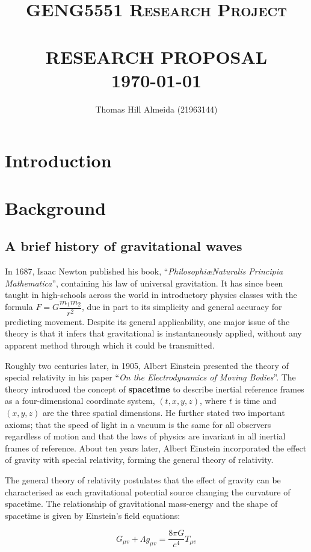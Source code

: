 \documentclass{article}
\title{\normalsize \textsc{GENG5551 Research Project}
        \\ [1.5cm]
        \HRule{0.5pt} \\
        \LARGE \textbf{\uppercase{Research Proposal}}
        \HRule{2pt} \\ [0.5cm]
        \normalsize \today \vspace*{3\baselineskip}}
\author{Thomas Hill Almeida (21963144)}
\date{}
\begin{document}
\maketitle{}
\tableofcontents{}
\newpage{}

\section*{Introduction}
\section{Background}

\subsection{A brief history of gravitational waves}

In 1687, Isaac Newton published his book, ``\textit{Philosophi\ae Naturalis Principia Mathematica}'', containing his law of universal gravitation. It has since been taught in high-schools across the world in introductory physics classes with the formula \( F = G\dfrac{m_1m_2}{r^2} \), due in part to its simplicity and general accuracy for predicting movement. Despite its general applicability, one major issue of the theory is that it infers that gravitational is instantaneously applied, without any apparent method through which it could be transmitted.

Roughly two centuries later, in 1905, Albert Einstein presented the theory of special relativity in his paper ``\textit{On the Electrodynamics of Moving Bodies}''. The theory introduced the concept of \textbf{spacetime} to describe inertial reference frames as a four-dimensional coordinate system, \((t, x, y, z)\), where $t$ is time and $(x, y, z)$ are the three spatial dimensions. He further stated two important axioms; that the speed of light in a vacuum is the same for all observers regardless of motion and that the laws of physics are invariant in all inertial frames of reference. About ten years later, Albert Einstein incorporated the effect of gravity with special relativity, forming the general theory of relativity.

The general theory of relativity postulates that the effect of gravity can be characterised as each gravitational potential source changing the curvature of spacetime. The relationship of gravitational mass-energy and the shape of spacetime is given by Einstein's field equations:

\begin{equation}
    G_{\mu{}v} + \Lambda{}g_{\mu{}v} = \dfrac{8\pi{}G}{c^4}T_{\mu{}v}
\end{equation}
\end{document}
